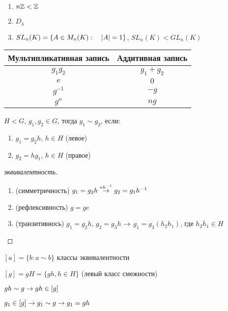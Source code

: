 \documentclass[main]{subfiles}
\begin{document}
  \begin{examples}
      \begin{enumerate}
      	\item $n\mathbb{Z} < \mathbb{Z}$
      	\item $D_4$
      	\item $SL_n(K)=\{A \in M_n(K): \quad |A|=1\}$, $SL_n(K)<GL_n(K)$
  	\end{enumerate}
  \end{examples}

  \begin{tabular} {c|c}
  	Мультипликативная запись & Аддитивная запись\\ \hline
  	$g_1 g_2$ & $g_1 + g_2$\\
  	$e$ & $0$\\
  	$g^{-1}$ & $-g$\\
      $g^n$ & $ng$
  \end{tabular}

  \begin{definition}
      $H<G$, $g_1,g_2 \in G$, тогда $g_1 \sim g_2$, если:
      \begin{enumerate}
      	\item $g_1=g_2 h$, $h \in H$ (левое)
      	\item $g_2=h g_1$, $h \in H$ (правое)
  	\end{enumerate}
  \end{definition}

  \begin{proof}[эквивалентность]
      \begin{enumerate}
      	\item (симметричность) $g_1=g_2 h \overset{*h^{-1}}{\rightarrow} g_2 = g_1 h^{-1}$
      	\item (рефлексивность) $g=ge$
      	\item (транзитивнось) $g_1=g_2 h$, $g_2 = g_3 h$ $\rightarrow$ $g_1=g_3(h_2 h_1)$, где $h_2 h_1 \in H$
  	\end{enumerate}
  \end{proof}

  \begin{definition}
      $[a] = \{b:a∼b\}$ классы эквивалентности
  \end{definition}

  \begin{definition}
      $[g] = g H = \{g h, h \in H \}$ (левый класс смежности)

      $g h \sim g \rightarrow g h \in [g]$

      $g_1 \in [g] \rightarrow g_1 \sim g \rightarrow g_1 = g h$
  \end{definition}
\end{document}
